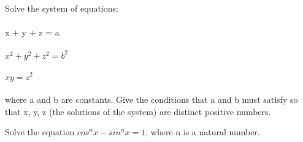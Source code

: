 \item Solve the system of equations:\\
\\ x + y + z = a\\
\\ $x^2 + y^2 + z^2 = b^2$\\
\\ $xy = z^2$\\
\\ where a and b are constants. Give the conditions that a and b must satisfy so that x, y, z (the solutions of the system) are distinct positive numbers.\\

\item Solve the equation $cos^n x - sin^n x = 1$, where n is a natural number.

